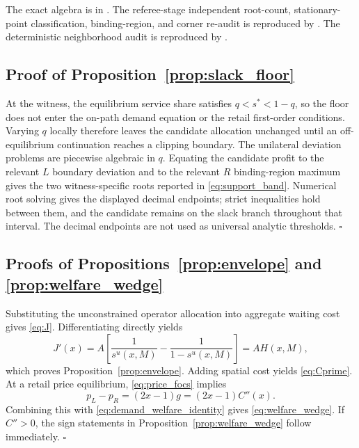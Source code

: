 The exact algebra is in . The referee-stage independent root-count, stationary-point classification, binding-region, and corner re-audit is reproduced by . The deterministic neighborhood audit is reproduced by .

\subsection{Proof of Proposition~\ref{prop:slack_floor}}

At the witness, the equilibrium service share satisfies $q<s^*<1-q$, so the floor does not enter the on-path demand equation or the retail first-order conditions. Varying $q$ locally therefore leaves the candidate allocation unchanged until an off-equilibrium continuation reaches a clipping boundary. The unilateral deviation problems are piecewise algebraic in $q$. Equating the candidate profit to the relevant $L$ boundary deviation and to the relevant $R$ binding-region maximum gives the two witness-specific roots reported in \eqref{eq:support_band}. Numerical root solving gives the displayed decimal endpoints; strict inequalities hold between them, and the candidate remains on the slack branch throughout that interval. The decimal endpoints are not used as universal analytic thresholds. \hfill$\square$

\subsection{Proofs of Propositions~\ref{prop:envelope} and \ref{prop:welfare_wedge}}

Substituting the unconstrained operator allocation into aggregate waiting cost gives \eqref{eq:J}. Differentiating directly yields
\begin{equation}
J'(x)=A\left[\frac{1}{s^u(x,M)}-\frac{1}{1-s^u(x,M)}\right]=AH(x,M),
\end{equation}
which proves Proposition~\ref{prop:envelope}. Adding spatial cost yields \eqref{eq:Cprime}. At a retail price equilibrium, \eqref{eq:price_focs} implies
\begin{equation}
p_L-p_R=(2x-1)g=(2x-1)C''(x).
\end{equation}
Combining this with \eqref{eq:demand_welfare_identity} gives \eqref{eq:welfare_wedge}. If $C''>0$, the sign statements in Proposition~\ref{prop:welfare_wedge} follow immediately. \hfill$\square$

